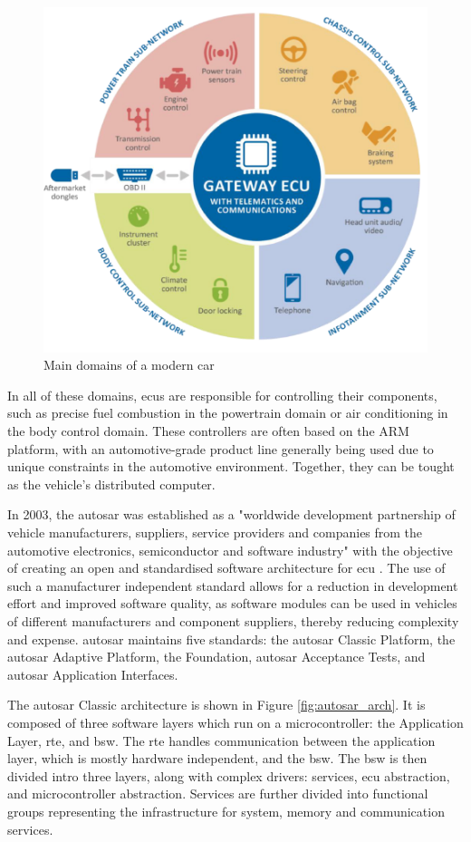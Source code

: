 \begin{figure}
    \centering
    \includegraphics[width = .7\textwidth]{img/parts/introduction/Vehicle Architecture.png}
    \caption{Main domains of a modern car \citep{ENISA}}
    \label{fig:Car_Domains}
\end{figure}

In all of these domains, \glspl{ecu} are responsible for controlling their components, such as precise fuel combustion in the powertrain domain or air conditioning in the body control domain. These controllers are often based on the ARM platform, with an automotive-grade product line generally being used due to unique constraints in the automotive environment. Together, they can be tought as the vehicle's distributed computer.\par

In 2003, the \gls{autosar} was established as a "worldwide development partnership of vehicle manufacturers, suppliers, service providers and companies from the automotive electronics, semiconductor and software industry" with the objective of creating an open and standardised software architecture for \gls{ecu} \citep{autosar}. The use of such a manufacturer independent standard allows for a reduction in development effort and improved software quality, as software modules can be used in vehicles of different manufacturers and component suppliers, thereby reducing complexity and expense. \gls{autosar} maintains five standards: the \gls{autosar} Classic Platform, the \gls{autosar} Adaptive Platform, the Foundation, \gls{autosar} Acceptance Tests, and \gls{autosar} Application Interfaces.\par

The \gls{autosar} Classic architecture is shown in Figure \ref{fig:autosar_arch}. It is composed of three software layers which run on a microcontroller: the Application Layer, \gls{rte}, and \gls{bsw}. The \gls{rte} handles communication between the application layer, which is mostly hardware independent, and the \gls{bsw}. The \gls{bsw} is then divided intro three layers, along with complex drivers: services, \gls{ecu} abstraction, and microcontroller abstraction. Services are further divided into functional groups representing the infrastructure for system, memory and communication services.

